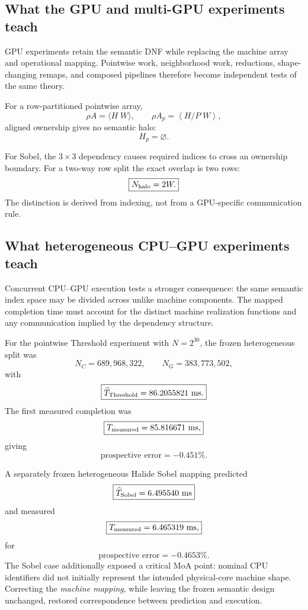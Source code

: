 \documentclass[11pt]{article}
\begin{document}
\subsection{What the GPU and multi-GPU experiments teach}

GPU experiments retain the semantic DNF while replacing the machine array and operational
mapping.  Pointwise work, neighborhood work, reductions, shape-changing remaps, and composed
pipelines therefore become independent tests of the same theory.

For a row-partitioned pointwise array,
\[
\rho A=\langle H\;W\rangle,\qquad
\rho A_p=\left\langle H/P\;W\right\rangle,
\]
aligned ownership gives no semantic halo:
\[
\boxed{H_p=\varnothing.}
\]

For Sobel, the \(3\times3\) dependency causes required indices to cross an ownership boundary.
For a two-way row split the exact overlap is two rows:
\[
\boxed{N_{\rm halo}=2W.}
\]
The distinction is derived from indexing, not from a GPU-specific communication rule.

\subsection{What heterogeneous CPU--GPU experiments teach}

Concurrent CPU--GPU execution tests a stronger consequence: the same semantic index space may
be divided across unlike machine components.  The mapped completion time must account for the
distinct machine realization functions and any communication implied by the dependency structure.

For the pointwise Threshold experiment with \(N=2^{30}\), the frozen heterogeneous split was
\[
\boxed{
N_C=689{,}968{,}322,\qquad
N_G=383{,}773{,}502,
}
\]
with
\[
\boxed{\widehat T_{\rm Threshold}=86.2055821\ {\rm ms}.}
\]
The first measured completion was
\[
\boxed{T_{\rm measured}=85.816671\ {\rm ms},}
\]
giving
\[
\boxed{\text{prospective error}=-0.451\%.}
\]

A separately frozen heterogeneous Halide Sobel mapping predicted
\[
\boxed{\widehat T_{\rm Sobel}=6.495540\ {\rm ms}}
\]
and measured
\[
\boxed{T_{\rm measured}=6.465319\ {\rm ms},}
\]
for
\[
\boxed{\text{prospective error}=-0.4653\%.}
\]
The Sobel case additionally exposed a critical MoA point: nominal CPU identifiers did not initially
represent the intended physical-core machine shape.  Correcting the \emph{machine mapping}, while
leaving the frozen semantic design unchanged, restored correspondence between prediction and
execution.
\end{document}
